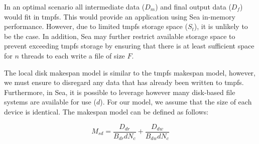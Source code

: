 \documentclass[10pt,journal,compsoc]{IEEEtran}
\begin{document}
      In an optimal scenario all intermediate data ($D_{m}$) and final output
      data ($D_{f}$) would fit in tmpfs. This would provide an application using
      Sea in-memory performance. However, due to limited tmpfs storage space ($S_{t}$), it is unlikely to be the case. In addition, Sea may further restrict
      available storage space to prevent exceeding tmpfs storage by ensuring that
      there is at least sufficient space for $n$ threads to each write a file of
      size $F$.

      The local disk  makespan model is similar to the tmpfs makespan model, however, we
      must ensure to disregard any data that has already been written to tmpfs.
      Furthermore, in Sea, it is possible to leverage however many disk-based
      file systems are available for use ($d$). For our model, we assume that the
      size of each device is identical.
      The makespan model can be defined as follows:

      \begin{equation}\label{eq:msd}
          M_{sd} =  \frac{D_{dr}}{B_{dr}dN_{c}} + \frac{D_{dw}}{B_{dw}dN_{c}}
      \end{equation}
\end{document}
